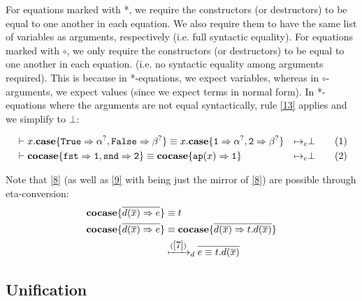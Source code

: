 \documentclass[twoside,12pt,a4paper]{article}
\begin{document}
For equations marked with *, we require the constructors (or destructors) to be equal to one another in each equation. 
We also require them to have the same list of variables as arguments, respectively (i.e. full syntactic equality).
For equations marked with $\circ$, we only require the constructors (or destructors) to be equal to one another in each equation. 
(i.e. no syntactic equality among arguments required).
This is because in *-equations, we expect variables, whereas in $\circ$-arguments, we expect values (since we expect terms in normal form).
In *-equations where the arguments are not equal syntactically, rule \ref{13} applies and we simplify to $\bot$:

\begin{example}
    \begin{align}
        &\vdash x.\textbf{case}\{\mathtt{True\Rightarrow \alpha^?, False \Rightarrow \beta^?}\} 
        \equiv x.\textbf{case}\{\mathtt{1\Rightarrow \alpha^?, 2\Rightarrow\beta^?}\}
        &\mapsto_c& \bot \tag{1}\\
        &\vdash \textbf{cocase}\{\mathtt{fst\Rightarrow 1, snd\Rightarrow 2}\}
        \equiv \textbf{cocase}\{\texttt{ap}(x)\Rightarrow \mathtt{1}\}
        &\mapsto_c& \bot \tag{2}
    \end{align}
\end{example}

Note that \ref{8} (as well as \ref{9} with being just the mirror of \ref{8}) are possible through eta-conversion:
\begin{align*}
    \textbf{cocase}\{\overline{d(\overline{x})\Rightarrow e}\}&\equiv t \\
    \textbf{cocase}\{\overline{d(\overline{x})\Rightarrow e}\}&\equiv \textbf{cocase}\{\overline{d(\overline{x})\Rightarrow t.d(\overline{x})}\}\\
    &\xmapsto{(\ref{7})}_d \overline{e \equiv t.d(\overline{x})}
\end{align*}

\subsection{Unification}
\end{document}
